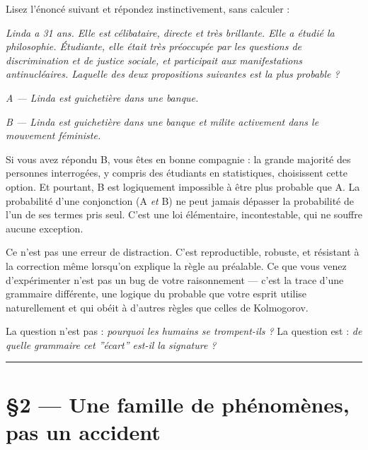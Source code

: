 \documentclass[french, 11pt, twoside, openright, a5paper]{book}
\begin{document}
Lisez l'énoncé suivant et répondez instinctivement, sans calculer :

\emph{Linda a 31 ans. Elle est célibataire, directe et très brillante.
Elle a étudié la philosophie. Étudiante, elle était très préoccupée par
les questions de discrimination et de justice sociale, et participait
aux manifestations antinucléaires. Laquelle des deux propositions
suivantes est la plus probable ?}

\emph{A --- Linda est guichetière dans une banque.}

\emph{B --- Linda est guichetière dans une banque et milite activement
dans le mouvement féministe.}

Si vous avez répondu B, vous êtes en bonne compagnie : la grande
majorité des personnes interrogées, y compris des étudiants en
statistiques, choisissent cette option. Et pourtant, B est logiquement
impossible à être plus probable que A. La probabilité d'une conjonction
(A \emph{et} B) ne peut jamais dépasser la probabilité de l'un de ses
termes pris seul. C'est une loi élémentaire, incontestable, qui ne
souffre aucune exception.

Ce n'est pas une erreur de distraction. C'est reproductible, robuste, et
résistant à la correction même lorsqu'on explique la règle au préalable.
Ce que vous venez d'expérimenter n'est pas un bug de votre raisonnement
--- c'est la trace d'une grammaire différente, une logique du probable
que votre esprit utilise naturellement et qui obéit à d'autres règles
que celles de Kolmogorov.

La question n'est pas : \emph{pourquoi les humains se trompent-ils ?} La
question est : \emph{de quelle grammaire cet ''écart'' est-il la
signature ?}

\begin{center}\rule{0.5\linewidth}{0.5pt}\end{center}

\cleardoublepage
\chapter*{§2 --- Une famille de phénomènes, pas un accident}
\end{document}
